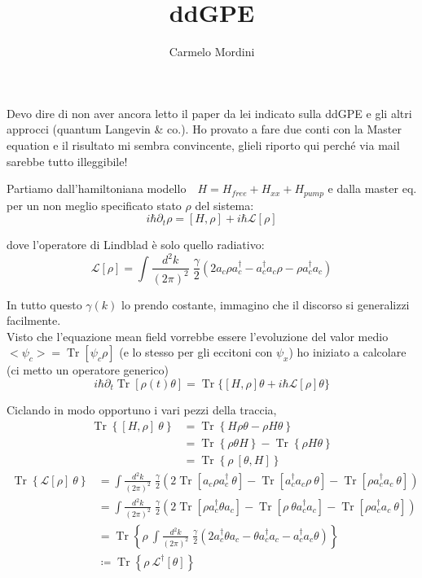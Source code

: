 \documentclass[mathserif]{article}
\title{ddGPE}
\author{Carmelo Mordini}
\DeclareMathOperator{\tr}{Tr}
\newcommand{\trcurl}[1]{\tr \left\{ #1 \right \}}
\newcommand{\lind}[1]{\mathcal{L}[#1]}
\newcommand{\intk}{\int\frac{d^2 k}{(2\pi)^2}\; }
\begin{document}
\maketitle


    Devo dire di non aver ancora letto il paper da lei indicato sulla ddGPE e gli altri approcci (quantum Langevin \& co.). Ho provato a fare due conti con la Master equation e il risultato mi sembra convincente, glieli riporto qui perché via mail sarebbe tutto illeggibile!

Partiamo dall'hamiltoniana modello$ \quad H = H_{free} + H_{xx} + H_{pump} $ e dalla master eq. per un non meglio specificato stato $\rho$ del sistema:
\begin{equation*}
i\hbar \partial_t\rho = [H,\rho] + i\hbar \lind \rho
\end{equation*}

dove l'operatore di Lindblad è solo quello radiativo:
\begin{equation*}
\lind \rho = \intk \frac{\gamma}{2} \left ( 2a_c\rho a_c^\dagger - a_c^\dagger a_c \rho - \rho a_c^\dagger a_c \right )
\end{equation*}

In tutto questo $\gamma(k)$ lo prendo costante, immagino che il discorso si generalizzi facilmente.\\
Visto che l'equazione mean field vorrebbe essere l'evoluzione del valor medio $<\psi_c> = \tr[\psi_c \rho]$ (e lo stesso per gli eccitoni con $\psi_x$) ho iniziato a calcolare (ci metto un operatore generico)
\begin{equation*}
i\hbar \partial_t \tr[\rho(t) \theta] = \tr \big\{ [H,\rho]\theta + i\hbar\lind \rho \theta \big \} 
\end{equation*}

Ciclando in modo opportuno i vari pezzi della traccia,
\begin{align*}
\trcurl{[H,\rho]\ \theta} &= \tr \left\{ H\rho\theta -\rho H           \theta \right \} \\ 
    &= \tr \left\{ \rho \theta H  \right \} - \trcurl{\rho H \theta  } \\ 
    &= \trcurl{\rho \ [\theta,H]}
\end{align*}
\begin{align*}
\trcurl{\lind \rho \ \theta} 
    &= \intk \frac{\gamma}{2} \left ( 2\tr[a_c\rho a_c^\dagger         \ \theta] - \tr[ a_c^\dagger a_c \rho \ \theta] -\tr[          \rho a_c^\dagger a_c\ \theta] \right ) \\
    &= \intk \frac{\gamma}{2} \left ( 2\tr[\rho a_c^\dagger \theta a_c] - \tr[ \rho \ \theta a_c^\dagger a_c ] -\tr[          \rho a_c^\dagger a_c\ \theta] \right ) \\
    &= \trcurl{\rho \ \intk \frac{\gamma}{2} \left ( 2a_c^\dagger \theta a_c - \theta a_c^\dagger a_c - a_c^\dagger a_c \theta  \right )} \\
    &\coloneqq \trcurl{\rho \ \mathcal{L}^\dagger [\theta]}
\end{align*}
\end{document}
